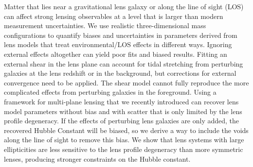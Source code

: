 Matter that lies near a gravitational lens galaxy or along the line of sight (LOS) can affect strong lensing observables at a level that is larger than modern measurement uncertainties. We use realistic three-dimensional mass configurations to quantify biases and uncertainties in parameters derived from lens models that treat environmental/LOS effects in different ways. Ignoring external effects altogether can yield poor fits and biased results. Fitting an external shear in the lens plane can account for tidal stretching from perturbing galaxies at the lens redshift or in the background, but corrections for external convergence need to be applied. The shear model cannot fully reproduce the more complicated effects from perturbing galaxies in the foreground. Using a framework for multi-plane lensing that we recently introduced \citep{McCully14} can recover lens model parameters without bias and with scatter that is only limited by the lens profile degeneracy. If the effects of perturbing lens galaxies are only added, the recovered Hubble Constant will be biased, so we derive a way to include the voids along the line of sight to remove this bias. We show that lens systems with large ellipticities are less sensitive to the lens profile degeneracy than more symmetric lenses, producing stronger constraints on the Hubble constant.
  